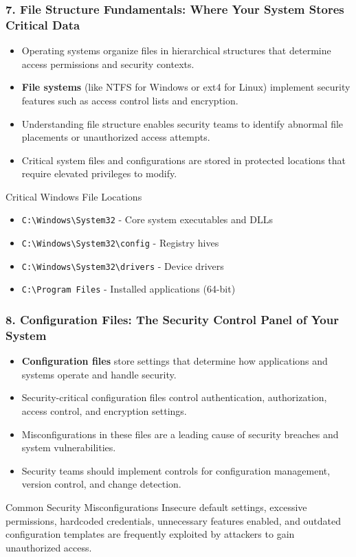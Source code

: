 \documentclass{beamer}
\begin{document}
	\begin{frame}
		\frametitle{7. File Structure Fundamentals: Where Your System Stores Critical Data}
		\begin{itemize}
			\item Operating systems organize files in hierarchical structures that determine access permissions and security contexts.
			\item \textbf{File systems} (like NTFS for Windows or ext4 for Linux) implement security features such as access control lists and encryption.
			\item Understanding file structure enables security teams to identify abnormal file placements or unauthorized access attempts.
			\item Critical system files and configurations are stored in protected locations that require elevated privileges to modify.
		\end{itemize}
		
		\begin{example}{Critical Windows File Locations}
			\scriptsize
			\begin{itemize}
				\item \texttt{C:\textbackslash Windows\textbackslash System32} - Core system executables and DLLs
				\item \texttt{C:\textbackslash Windows\textbackslash System32\textbackslash config} - Registry hives
				\item \texttt{C:\textbackslash Windows\textbackslash System32\textbackslash drivers} - Device drivers
				\item \texttt{C:\textbackslash Program Files} - Installed applications (64-bit)
			\end{itemize}
		\end{example}
	\end{frame}
	
	\begin{frame}
		\frametitle{8. Configuration Files: The Security Control Panel of Your System}
		\begin{itemize}
			\item \textbf{Configuration files} store settings that determine how applications and systems operate and handle security.
			\item Security-critical configuration files control authentication, authorization, access control, and encryption settings.
			\item Misconfigurations in these files are a leading cause of security breaches and system vulnerabilities.
			\item Security teams should implement controls for configuration management, version control, and change detection.
		\end{itemize}
		
		\begin{alertblock}{Common Security Misconfigurations}
			Insecure default settings, excessive permissions, hardcoded credentials, unnecessary features enabled, and outdated configuration templates are frequently exploited by attackers to gain unauthorized access.
		\end{alertblock}
	\end{frame}
	
\end{document}
